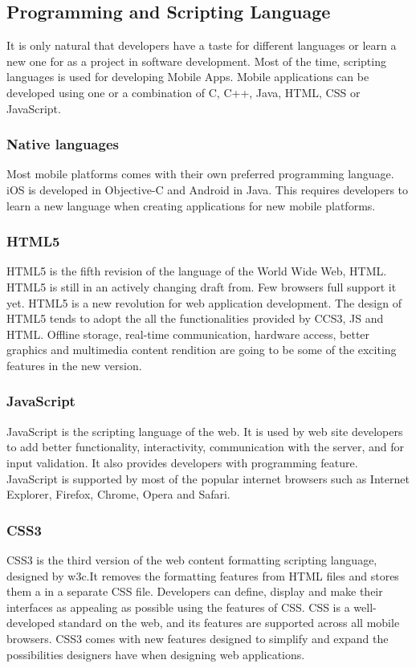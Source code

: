 \subsection{Programming and Scripting Language}
It is only natural that developers have a taste for different languages or
learn a new one for as a project in software development. Most of the time,
scripting languages is used for developing Mobile Apps. Mobile applications
can be developed using one or a combination of C, C++, Java, HTML, CSS or JavaScript.

\subsubsection{Native languages}
Most mobile platforms comes with their own preferred programming language. iOS is developed in Objective-C and Android in Java. This requires developers to learn a new language when creating applications for new mobile platforms.

\subsubsection{HTML5}
HTML5 is the fifth revision of the language of the World Wide Web, HTML.
 HTML5 is still in an actively changing draft from. Few browsers full
 support it yet. HTML5 is a new revolution for web application development.
 The design of HTML5 tends to adopt the all the functionalities provided
 by CCS3, JS and HTML.  Offline storage, real-time communication, hardware
 access, better graphics and multimedia content rendition are going to be
 some of the exciting features in the new version.

 \subsubsection{JavaScript}
 JavaScript is the scripting language of the web.
 It is used by web site developers to add better
 functionality, interactivity, communication with the
 server, and for input validation. It also provides developers
 with programming feature. JavaScript is supported by most of
 the popular internet browsers such as Internet Explorer, Firefox,
 Chrome, Opera and Safari.

 \subsubsection{CSS3}
 CSS3 is the third version of the web content formatting scripting language,
 designed by w3c.It removes the formatting features from HTML files and
 stores them a in a separate CSS file.
Developers can define, display and make their interfaces as appealing
as possible using the features of CSS.
CSS is a well-developed standard on the web, and its features are supported across all mobile browsers. CSS3 comes with new features designed to simplify and expand the possibilities designers have when designing web applications.

